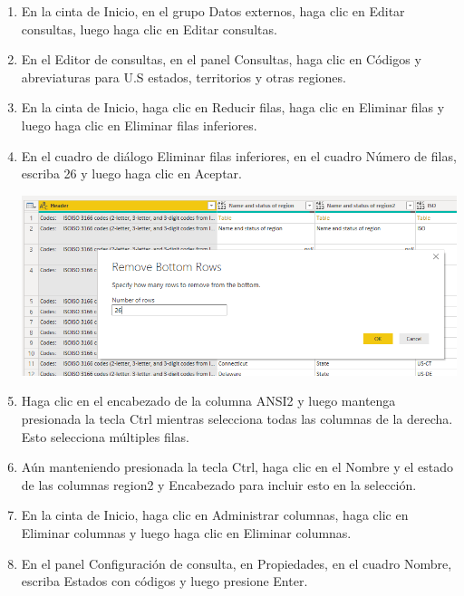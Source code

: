 \begin{enumerate}
    \item En la cinta de Inicio, en el grupo Datos externos, haga clic en Editar consultas, luego haga clic en Editar consultas.
    
    
    
    \item En el Editor de consultas, en el panel Consultas, haga clic en Códigos y abreviaturas para U.S estados, territorios y otras regiones.

     
    \item En la cinta de Inicio, haga clic en Reducir filas, haga clic en Eliminar filas y luego haga clic en Eliminar filas inferiores.
    
    \item En el cuadro de diálogo Eliminar filas inferiores, en el cuadro Número de filas, escriba 26 y luego haga clic en Aceptar.
    
        \begin{center}
	\includegraphics[width=13cm]{./Imagenes/9}
	\end{center}

    \item Haga clic en el encabezado de la columna ANSI2 y luego mantenga presionada la tecla Ctrl mientras selecciona todas las columnas de la derecha. Esto selecciona múltiples filas.
    
    \item Aún manteniendo presionada la tecla Ctrl, haga clic en el Nombre y el estado de las columnas region2 y Encabezado para incluir esto en la selección.

 
    \item En la cinta de Inicio, haga clic en Administrar columnas, haga clic en Eliminar columnas y luego haga clic en Eliminar columnas.
    
    \item En el panel Configuración de consulta, en Propiedades, en el cuadro Nombre, escriba Estados con códigos y luego presione Enter.


\end{enumerate}
